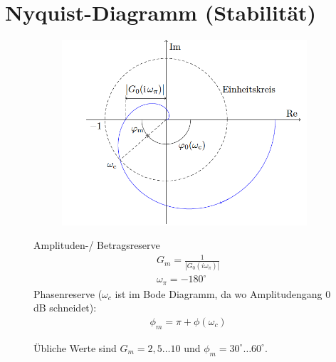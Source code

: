 \setcounter{section}{8}
\section{Nyquist-Diagramm (Stabilität)}
\begin{tcolorbox}[colback=white!10!white,
                  colframe=green!30!black,
                  title=Nyquist]
\begin{figure}[H]
    \begin{subfigure}{0.5\linewidth}
        \includegraphics[width=\linewidth]{images/nyquist}
        \label{fig:nyquist}
    \end{subfigure}
    \begin{minipage}{0.45\linewidth}
        Amplituden-/ Betragsreserve 
        \begin{align*}
            &G_m = \frac{1}{|G_0(i\omega_\pi)|}\\
            & \omega_\pi = -180^{\circ}
        \end{align*}
        Phasenreserve ($\omega_c$ ist im Bode Diagramm, da wo Amplitudengang $0$dB schneidet):
        \begin{align*}
            &\phi_m = \pi + \phi(\omega_c)
        \end{align*}
    \end{minipage}
    Übliche Werte sind $G_m = 2,5 \ldots  10$ und $\phi_m = 30^{\circ} \dots 60^{\circ}  $. 
    

\end{figure}
\end{tcolorbox}
